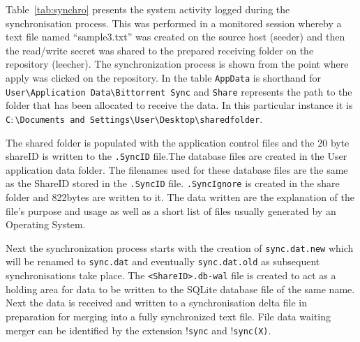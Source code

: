 \documentclass[final,5p,times,twocolumn]{elsarticle}
\begin{document}
Table~\ref{tab:synchro} presents the system activity logged during the synchronisation process. This was performed in a monitored session whereby a text file named ``sample3.txt'' was created on the source host (seeder) and then the read/write secret was shared to the prepared receiving folder on the repository (leecher).
The synchronization process is shown from the point where apply was clicked on the repository. In the table \texttt{AppData} is shorthand for \\\texttt{{\selectfont\texttildelow}User\textbackslash Application Data\textbackslash Bittorrent Sync} and \texttt{Share} represents the path to the folder that has been allocated to receive the data. In this particular instance it is \texttt{C$:$\textbackslash Documents and Settings\textbackslash User\textbackslash Desktop\textbackslash sharedfolder}.

The shared folder is populated with the application control files and the 20 byte shareID is written to the \texttt{.SyncID} file.The database files are created in the User application data folder. The filenames used for these database files are the same as the ShareID stored in the \texttt{.SyncID} file. \texttt{.SyncIgnore} is created in the share folder and 822bytes are written to it. The data written are the explanation of the file's purpose and usage as well as a short list of
files usually generated by an Operating System.

Next the synchronization process starts with the creation of \texttt{sync.dat.new} which will be renamed to \texttt{sync.dat} and eventually \texttt{sync.dat.old} as subsequent synchronisations take place. The \texttt{<ShareID>.db-wal} file is created to act as a holding area for data to be written to the SQLite database file of the same name. Next the data is received and written to a synchronisation delta file in preparation for merging into a fully synchronized text file. File data waiting merger can be identified by the extension \texttt{$!$sync} and \texttt{$!$sync(X)}.
\end{document}

